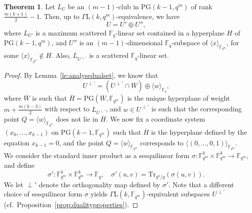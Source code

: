 \documentclass[11pt]{amsart}
\theoremstyle{definition}
\newtheorem{theorem}{Theorem}[section]
\newcommand{\F}{{\mathbb F}}
\begin{document}
\begin{theorem} \label{th:classn-1clubmaximum}
Let \(L_U\) be an \((m - 1)\)-club in \(\mathrm{PG}(k - 1, q^m)\) of rank \(\frac{m(k + 1)}{2} - 1\). Then, up to $\Gamma \mathrm{L}(k,q^m)$-equivalence, we have
\[
U = U' \oplus U'',
\]
where \(L_{U'}\) is a maximum scattered \(\mathbb{F}_q\)-linear set contained in a hyperplane \(H\) of \(\mathrm{PG}(k - 1, q^m)\), and \(U''\) is an \((m - 1)\)-dimensional \(\mathbb{F}_q\)-subspace of \(\langle x \rangle_{\mathbb{F}_{q^m}}\), for some \(\langle x \rangle_{\mathbb{F}_{q^m}} \notin H\). Also, $L_{U^{\perp'}}$ is a scattered $\F_q$-linear set. 
\end{theorem}
\begin{proof}
By Lemma~\ref{le:analysedualset}, we know that
\[
U^{\perp'} = (U^{\perp'} \cap \overline{W}) \oplus \langle w \rangle_{\mathbb{F}_q},
\]
where \(\overline{W}\) is such that \(\overline{H} = \mathrm{PG}(\overline{W}, \mathbb{F}_{q^m})\) is the unique hyperplane of weight \(m + \frac{m(k - 3)}{2}\) with respect to \(L_{U^{\perp'}}\), and \(w \in U^{\perp'}\) is such that the corresponding point \(Q = \langle w \rangle_{\mathbb{F}_{q^m}}\) does not lie in \(\overline{H}\).
We now fix a coordinate system \((x_0, \ldots, x_{k-1})\) on \(\mathrm{PG}(k - 1, \mathbb{F}_{q^m})\) such that \(\overline{H}\) is the hyperplane defined by the equation \(x_{k-1} = 0\), and the point \(Q = \langle w \rangle_{\mathbb{F}_{q^m}}\) corresponds to \(\langle (0, \ldots, 0, 1) \rangle_{\mathbb{F}_{q^m}}\).
We consider the standard inner product as a sesquilinear form \(\sigma \colon \mathbb{F}_{q^m}^k \times \mathbb{F}_{q^m}^k \rightarrow \mathbb{F}_{q^m}\), and define
\[
\sigma' \colon \mathbb{F}_{q^m}^k \times \mathbb{F}_{q^m}^k \rightarrow \mathbb{F}_q, \quad \sigma'(u,v) = \mathrm{Tr}_{q^n/q}(\sigma(u,v)).
\]
We let \(\perp'\) denote the orthogonality map defined by \(\sigma'\). Note that a different choice of sesquilinear form \(\sigma\) yields \(\Gamma \mathrm{L}(k, \mathbb{F}_{q^m})\)-equivalent subspaces \(U^{\perp'}\) (cf.\ Proposition~\ref{prop:dualityproperties}).



\end{proof}
\end{document}
